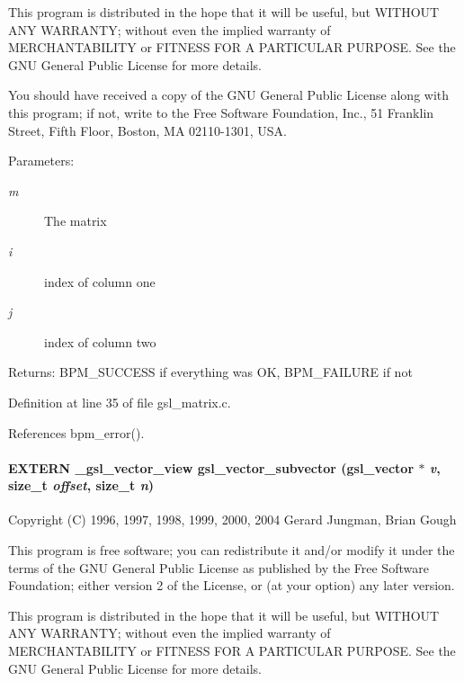 This program is distributed in the hope that it will be useful, but WITHOUT ANY WARRANTY; without even the implied warranty of MERCHANTABILITY or FITNESS FOR A PARTICULAR PURPOSE. See the GNU General Public License for more details.

You should have received a copy of the GNU General Public License along with this program; if not, write to the Free Software Foundation, Inc., 51 Franklin Street, Fifth Floor, Boston, MA 02110-1301, USA.

\begin{Desc}
\item[Parameters:]
\begin{description}
\item[{\em m}]The matrix \item[{\em i}]index of column one \item[{\em j}]index of column two\end{description}
\end{Desc}
\begin{Desc}
\item[Returns:]BPM\_\-SUCCESS if everything was OK, BPM\_\-FAILURE if not \end{Desc}


Definition at line 35 of file gsl\_\-matrix.c.

References bpm\_\-error().
\paragraph[gsl\_\-vector\_\-subvector]{\setlength{\rightskip}{0pt plus 5cm}EXTERN \_\-gsl\_\-vector\_\-view gsl\_\-vector\_\-subvector (gsl\_\-vector $\ast$ {\em v}, \/  size\_\-t {\em offset}, \/  size\_\-t {\em n})}\hfill\label{group__nr_gb51674cd9845afc9425efbe4df5d1c1e}




Copyright (C) 1996, 1997, 1998, 1999, 2000, 2004 Gerard Jungman, Brian Gough

This program is free software; you can redistribute it and/or modify it under the terms of the GNU General Public License as published by the Free Software Foundation; either version 2 of the License, or (at your option) any later version.

This program is distributed in the hope that it will be useful, but WITHOUT ANY WARRANTY; without even the implied warranty of MERCHANTABILITY or FITNESS FOR A PARTICULAR PURPOSE. See the GNU General Public License for more details.

